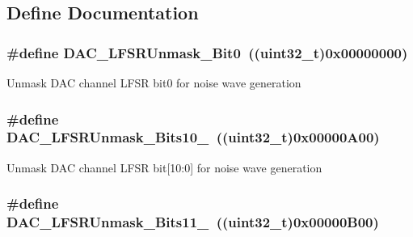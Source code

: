 \subsection{Define Documentation}
\hypertarget{group__DAC__lfsrunmask__triangleamplitude_ga60794fd5092a332cfa82e1cee13945fc}{
\subsubsection[{DAC\_\-LFSRUnmask\_\-Bit0}]{\setlength{\rightskip}{0pt plus 5cm}\#define DAC\_\-LFSRUnmask\_\-Bit0~((uint32\_\-t)0x00000000)}}
\label{group__DAC__lfsrunmask__triangleamplitude_ga60794fd5092a332cfa82e1cee13945fc}
Unmask DAC channel LFSR bit0 for noise wave generation \hypertarget{group__DAC__lfsrunmask__triangleamplitude_ga7670f0e10f062571d0e56027ef653228}{
\subsubsection[{DAC\_\-LFSRUnmask\_\-Bits10\_\-0}]{\setlength{\rightskip}{0pt plus 5cm}\#define DAC\_\-LFSRUnmask\_\-Bits10\_~((uint32\_\-t)0x00000A00)}}
\label{group__DAC__lfsrunmask__triangleamplitude_ga7670f0e10f062571d0e56027ef653228}
Unmask DAC channel LFSR bit\mbox{[}10:0\mbox{]} for noise wave generation \hypertarget{group__DAC__lfsrunmask__triangleamplitude_gaeb9b5992b771f9a14587eeda58227831}{
\subsubsection[{DAC\_\-LFSRUnmask\_\-Bits11\_\-0}]{\setlength{\rightskip}{0pt plus 5cm}\#define DAC\_\-LFSRUnmask\_\-Bits11\_~((uint32\_\-t)0x00000B00)}}
\label{group__DAC__lfsrunmask__triangleamplitude_gaeb9b5992b771f9a14587eeda58227831}

